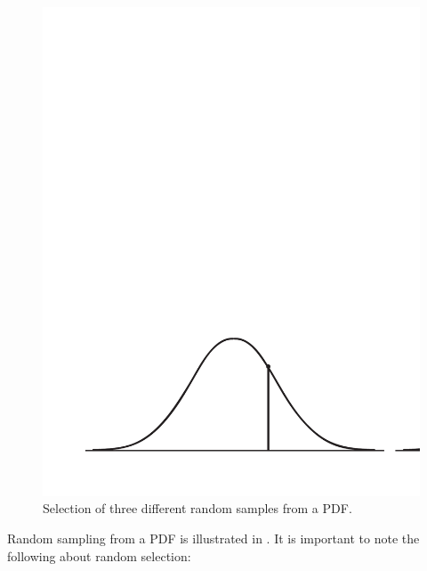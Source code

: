 \begin{figure}
\includegraphics[width=1\textwidth]{diags/fig-hattn-random}
\caption{Selection of three different random samples from a PDF.}
\label{fig:hattn-randomsamp}
\end{figure}
Random sampling from a PDF is illustrated in
. It is important to note the following
about random selection:
